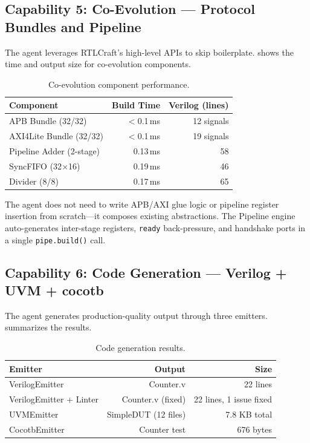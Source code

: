 \documentclass[11pt]{article}
\begin{document}
\subsection{Capability 5: Co-Evolution --- Protocol Bundles and Pipeline}
\label{sec:exp_coevolve}

The agent leverages RTLCraft's high-level APIs to skip boilerplate.  shows the time and output size for co-evolution components.

\begin{table}[htbp]
\centering
\caption{Co-evolution component performance.}
\label{tab:coevolve}
\begin{tabular}{@{}lrr@{}}
    \toprule
    \textbf{Component} & \textbf{Build Time} & \textbf{Verilog (lines)} \\
    \midrule
    APB Bundle (32/32) & $<$0.1\,ms & 12 signals \\
    AXI4Lite Bundle (32/32) & $<$0.1\,ms & 19 signals \\
    Pipeline Adder (2-stage) & 0.13\,ms & 58 \\
    SyncFIFO (32$\times$16) & 0.19\,ms & 46 \\
    Divider (8/8) & 0.17\,ms & 65 \\
    \bottomrule
\end{tabular}
\end{table}

The agent does not need to write APB/AXI glue logic or pipeline register insertion from scratch---it composes existing abstractions. The Pipeline engine auto-generates inter-stage registers, \texttt{ready} back-pressure, and handshake ports in a single \texttt{pipe.build()} call.

\subsection{Capability 6: Code Generation --- Verilog + UVM + cocotb}
\label{sec:exp_codegen}

The agent generates production-quality output through three emitters.  summarizes the results.

\begin{table}[htbp]
\centering
\caption{Code generation results.}
\label{tab:codegen}
\begin{tabular}{@{}lrr@{}}
    \toprule
    \textbf{Emitter} & \textbf{Output} & \textbf{Size} \\
    \midrule
    VerilogEmitter & Counter.v & 22 lines \\
    VerilogEmitter + Linter & Counter.v (fixed) & 22 lines, 1 issue fixed \\
    UVMEmitter & SimpleDUT (12 files) & 7.8 KB total \\
    CocotbEmitter & Counter test & 676 bytes \\
    \bottomrule
\end{tabular}
\end{table}
\end{document}
